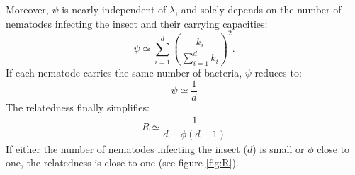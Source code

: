 \documentclass[10pt]{article}
\newcommand{\psis}{\psi}
\begin{document}
\begin{multicols}{2}
Moreover, $\psis$ is nearly independent of $\lambda$, and solely depends on the number of nematodes infecting the insect and their carrying capacities:
 \begin{equation}
\psis \simeq \displaystyle \sum_{i=1}^d \left( \dfrac{ k_i}{\sum_{i=1}^d k_i} \right)^2. \label{eqn:star}
 \end{equation}
If each nematode carries the same number of bacteria, $\psis$ reduces to:
\begin{equation}
\psis \simeq \dfrac{1}{d}
\end{equation}
The relatedness finally simplifies:
 \begin{align}
  R \simeq \dfrac{ 1  }{ d - \phi (d- 1 ) } \label{eqn:R_d_phi}
 \end{align}
 If either the number of nematodes infecting the insect ($d$) is small or $\phi$ close to one, the relatedness is close to one (see figure \ref{fig:R}).

\end{multicols}
\end{document}
